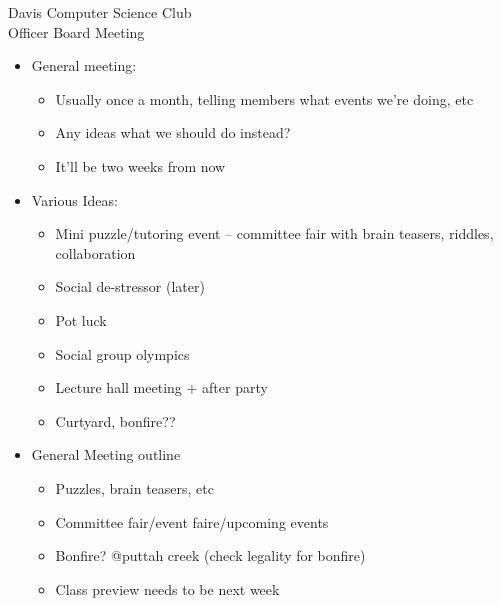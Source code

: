 \documentclass{article}
\begin{document}
\begin{Minutes}{Davis Computer Science Club\\Officer Board Meeting}




\maketitle

\begin{itemize}
    \item General meeting:
        \begin{itemize}
            \item Usually once a month, telling members what events we’re doing, etc
            \item Any ideas what we should do instead?
            \item It’ll be two weeks from now
        \end {itemize}
    \item Various Ideas:
    \begin {itemize}
	    \item Mini puzzle/tutoring event -- committee fair with brain teasers, riddles, collaboration
	    \item Social de-stressor (later)
	    \item Pot luck
	    \item Social group olympics
        \item Lecture hall meeting + after party 
	    \item Curtyard, bonfire??
    \end{itemize}
   \item General Meeting outline 
    \begin{itemize} 
        \item Puzzles, brain teasers, etc
        \item Committee fair/event faire/upcoming events
        \item Bonfire? @puttah creek (check legality for bonfire)
        \item Class preview needs to be next week
    \end{itemize}
\end{itemize}


\end{Minutes}
\end{document}
